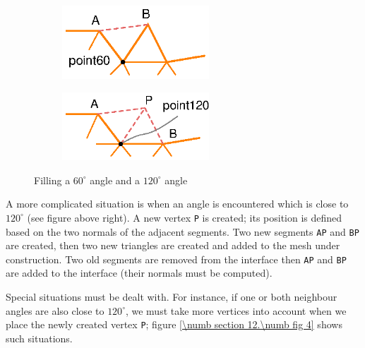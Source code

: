 \begin{figure}[ht] \centering
\begin{subfigure}{71mm}\centering
  \includegraphics[width=55mm]{fill-angle-60}
\end{subfigure}  
\begin{subfigure}{71mm}\centering
  \includegraphics[width=55mm]{fill-angle-120}
\end{subfigure}  
  \caption{Filling a $ 60^\circ $ angle and a $ 120^\circ $ angle}
  \label{\numb section 12.\numb fig 3}
\end{figure}

A more complicated situation is when an angle is encountered which is close to $ 120^\circ $
(see figure above right).
A new vertex {\small\tt P} is created; its position is defined based on the two normals
of the adjacent segments.
Two new segments {\small\tt AP} and {\small\tt BP} are created,
then two new triangles are created and added to the mesh under construction.
Two old segments are removed from the interface then {\small\tt AP} and {\small\tt BP} are added
to the interface (their normals must be computed).

Special situations must be dealt with.
For instance, if one or both neighbour angles are also close to $ 120^\circ $,
we must take more vertices into account when we place the newly created vertex {\small\tt P};
figure \ref{\numb section 12.\numb fig 4} shows such situations.

